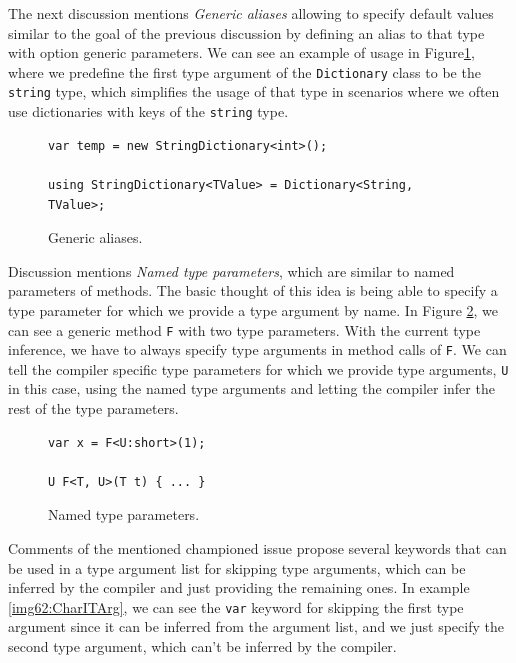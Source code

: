 \par
{}
The next discussion \cite{online:GenAlias} mentions \textit{Generic aliases} allowing to specify default values similar to the goal of the previous discussion by defining an alias to that type with option generic parameters. 
We can see an example of usage in Figure\ref{img60:genAlias}, where we predefine the first type argument of the \texttt{Dictionary} class to be the \texttt{string} type, which simplifies the usage of that type in scenarios where we often use dictionaries with keys of the \texttt{string} type.
\par
\begin{figure}
\begin{lstlisting}[style=csharp]
var temp = new StringDictionary<int>();

using StringDictionary<TValue> = Dictionary<String, TValue>;
\end{lstlisting}
\caption{Generic aliases.}
\label{img60:genAlias}
\end{figure}
\par
{}
Discussion \cite{online:NamedTypeParam} mentions \textit{Named type parameters}, which are similar to named parameters of methods. 
The basic thought of this idea is being able to specify a type parameter for which we provide a type argument by name. 
In Figure \ref{img61:NamedTParam}, we can see a generic method \texttt{F} with two type parameters. 
With the current type inference, we have to always specify type arguments in method calls of \texttt{F}. 
We can tell the compiler specific type parameters for which we provide type arguments, \texttt{U} in this case,  using the named type arguments and letting the compiler infer the rest of the type parameters.
\par
\begin{figure}
\begin{lstlisting}[style=csharp]
var x = F<U:short>(1);

U F<T, U>(T t) { ... }
\end{lstlisting}
\caption{Named type parameters.}
\label{img61:NamedTParam}
\end{figure}
\par
{}
Comments of the mentioned championed issue \cite{online:champion} propose several keywords that can be used in a type argument list for skipping type arguments, which can be inferred by the compiler and just providing the remaining ones. 
In example \ref{img62:CharITArg}, we can see the \texttt{var} keyword for skipping the first type argument since it can be inferred from the argument list, and we just specify the second type argument, which can’t be inferred by the compiler. 
